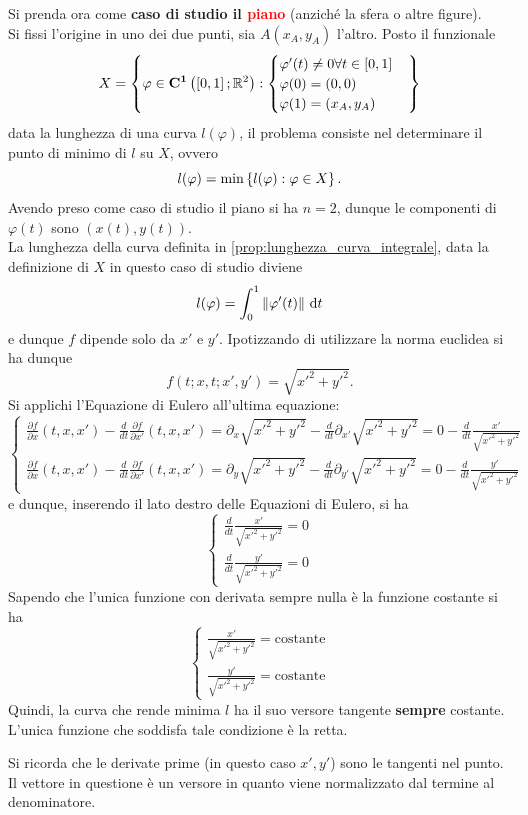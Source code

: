 \doublespacing
\par
Si prenda ora come \textbf{caso di studio il \textcolor{red}{piano}} (anziché la sfera o altre figure).\\
Si fissi l'origine in uno dei due punti, sia $A(x_A,y_A)$ l'altro. Posto il funzionale
\[
	X = \left\{
		\varphi \in \mathbf{C^{1}}\left(\left[ 0,1 \right]; \mathbb{R}^2\right) : 
		\begin{cases}
			\varphi'(t) \neq 0 \forall t \in \left[ 0,1 \right]\\
			\varphi(0) = \left( 0,0 \right)\\
			\varphi(1) = \left( x_A,y_A \right)
		\end{cases}
	\right\}
\]
data la lunghezza di una curva $l(\varphi)$, il problema consiste nel determinare il punto di minimo di $l$ su $X$, ovvero
\[ l(\varphi) = \min\left\{l(\varphi) : \varphi \in X\right\}. \]
Avendo preso come caso di studio il piano si ha $n = 2$,
dunque le componenti di $\varphi(t)$ sono $ \left(x(t),y(t)\right) $.\\
La lunghezza della curva definita in \ref{prop:lunghezza_curva_integrale}, data la definizione di $X$ in questo caso di studio diviene
\[ l(\varphi)=\int_0^1 \left\|\varphi'(t)\right\|\,\mathrm{d}{t} \]
e dunque $f$ dipende solo da $x' \text{ e } y'$. Ipotizzando di utilizzare la norma euclidea si ha dunque
\[ f(t; x, t; x', y') = \sqrt{x'^2 + y'^2}. \]
Si applichi l'Equazione di Eulero all'ultima equazione:
\[
	\begin{cases}
		\frac{\partial f}{\partial x}(t, x, x') - \frac{d}{dt}\frac{\partial f}{\partial x'}(t, x, x') =
		\partial_x \sqrt{x'^2 + y'^2} - \frac{d}{dt}\partial_{x'} \sqrt{x'^2 + y'^2} =
		0 - \frac{d}{dt} \frac{x'}{\sqrt{x'^2 + y'^2}}
		\\
		\frac{\partial f}{\partial x}(t, x, x') - \frac{d}{dt}\frac{\partial f}{\partial x'}(t, x, x') =
		\partial_y \sqrt{x'^2 + y'^2} - \frac{d}{dt}\partial_{y'} \sqrt{x'^2 + y'^2} =
		0 - \frac{d}{dt} \frac{y'}{\sqrt{x'^2 + y'^2}}
	\end{cases}
\]
e dunque, inserendo il lato destro delle Equazioni di Eulero, si ha
\[
	\begin{cases}
		\frac{d}{dt} \frac{x'}{\sqrt{x'^2 + y'^2}} = 0\\
		\frac{d}{dt} \frac{y'}{\sqrt{x'^2 + y'^2}} = 0
	\end{cases}
\]
Sapendo che l'unica funzione con derivata sempre nulla è la funzione costante si ha
\[
	\begin{cases}
		\frac{x'}{\sqrt{x'^2 + y'^2}} = \text{costante}
		\\
		\frac{y'}{\sqrt{x'^2 + y'^2}} = \text{costante}
	\end{cases}
\]
Quindi, la curva che rende minima $l$ ha il suo versore tangente \textbf{sempre} costante. L'unica funzione che soddisfa tale condizione è la retta.
\begin{note}
	Si ricorda che le derivate prime (in questo caso $x', y'$) sono le tangenti nel punto.\\
	Il vettore in questione è un versore in quanto viene normalizzato dal termine al denominatore.
\end{note}

